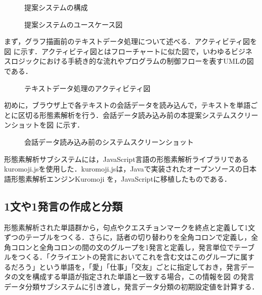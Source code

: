 \documentclass[shuuron]{kuee}
\begin{document}
\begin{figure}
   \begin{center}
   \end{center}
   \caption{提案システムの構成}
   \label{fig:4_2}
 \end{figure}

\begin{figure}
   \begin{center}
   \end{center}
   \caption{提案システムのユースケース図}
   \label{fig:use_case_diagram}
 \end{figure}


まず，グラフ描画前のテキストデータ処理について述べる．アクティビティ図を図
に示す．アクティビティ図とはフローチャートに似た図で，いわゆるビジネスロジックにおける手続き的な流れやプログラムの制御フローを表すUMLの図である．
\begin{figure}
   \begin{center}
   \end{center}
   \caption{テキストデータ処理のアクティビティ図}
   \label{fig:activity}
\end{figure}


初めに，ブラウザ上で各テキストの会話データを読み込んで，テキストを単語ごとに区切る形態素解析を行う．会話データ読み込み前の本提案システムスクリーンショットを図
に示す．
 \begin{figure}
   \begin{center}
   \end{center}
   \caption{会話データ読み込み前のシステムスクリーンショット}
   \label{fig:yomikomimae2}
 \end{figure}
形態素解析サブシステムには，JavaScript言語の形態素解析ライブラリであるkuromoji.js\cite{kuromojijs}を使用した．kuromoji.jsは，Javaで実装されたオープンソースの日本語形態素解析エンジンKuromoji
を，JavaScriptに移植したものである．

\subsection{1文や1発言の作成と分類}%
形態素解析された単語群から，句点やクエスチョンマークを終点と定義して1文ずつのテーブルをつくる．さらに，話者の切り替わりを全角コロンで定義し，全角コロンと全角コロンの間の文のグループを1発言と定義し，発言単位でテーブルをつくる．「クライエントの発言においてこれを含む文はこのグループに属するだろう」という単語を，「愛」「仕事」「交友」ごとに指定しておき，発言データの文を構成する単語が指定された単語と一致する場合，この情報を図
の発言データ分類サブシステムに引き渡し，発言データ分類の初期設定値を計算する．
\end{document}
